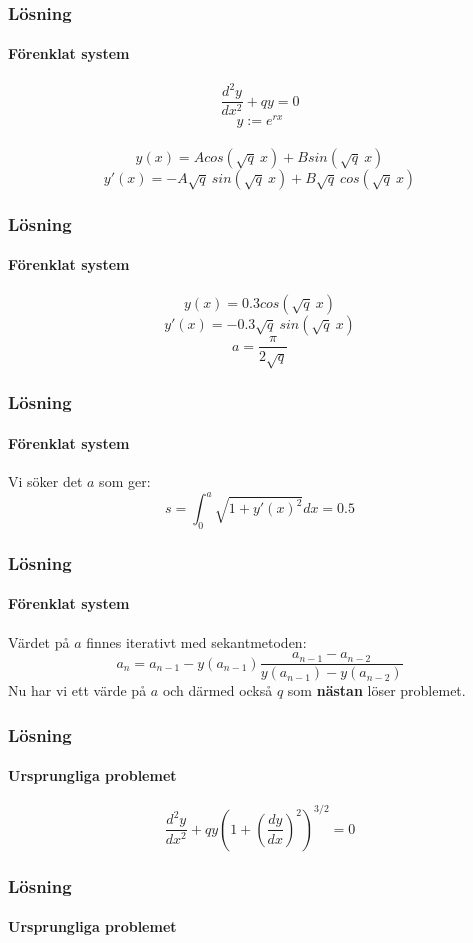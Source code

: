 \documentclass[xcolor=dvipsnames]{beamer}
\begin{document}
\begin{frame}
\frametitle{Lösning}
\framesubtitle{Förenklat system}
\begin{equation} \label{eq:simplified}
	\dfrac{d^2y}{dx^2} + qy = 0 \nonumber
\end{equation}
\begin{equation}
	y:=e^{rx} \nonumber
\end{equation}
\\
\begin{equation}
 y(x) = A cos(\sqrt{q}\:x)+B sin(\sqrt{q}\:x) \nonumber
\end{equation}
\begin{equation}
 y'(x) = -A\sqrt{q}\: sin(\sqrt{q}\:x) + B\sqrt{q}\:cos(\sqrt{q}\:x) \nonumber
\end{equation}
\end{frame}

\begin{frame}
\frametitle{Lösning}
\framesubtitle{Förenklat system}
\begin{equation} \label{eq:y}
 y(x) = 0.3 cos(\sqrt{q}\:x) \nonumber
\end{equation}
\begin{equation} \label{eq:yprime}
 y'(x) = -0.3\sqrt{q}\: sin(\sqrt{q}\:x) \nonumber
\end{equation}
\begin{equation}
 a = \dfrac{\pi}{2\sqrt{q}} \nonumber
\end{equation}
\end{frame}

\begin{frame}
\frametitle{Lösning}
\framesubtitle{Förenklat system}
Vi söker det $a$ som ger:
\begin{equation}
s = \int_0^a{\sqrt{1+y'(x)^2}}{dx}=0.5 \nonumber
\end{equation}
\usebox{\firstexample}
\end{frame}

\begin{frame}
\frametitle{Lösning}
\framesubtitle{Förenklat system}
Värdet på $a$ finnes iterativt med sekantmetoden:
\begin{equation}
a_n =a_{n-1}-y(a_{n-1})\frac{a_{n-1}-a_{n-2}}{y(a_{n-1})-y(a_{n-2})} \nonumber
\end{equation}
Nu har vi ett värde på $a$ och därmed också $q$ som \textbf{nästan} löser problemet.
\end{frame}

\begin{frame}
\frametitle{Lösning}
\framesubtitle{Ursprungliga problemet}
\begin{equation} \label{eq:original}
	\dfrac{d^2y}{dx^2} + qy \left(1+\left(\dfrac{dy}{dx}\right)^2\right)^{3/2} = 0 \nonumber
\end{equation}
\end{frame}
\begin{frame}
\frametitle{Lösning}
\framesubtitle{Ursprungliga problemet}
\usebox{\findroot}
\usebox{\original}
\end{frame}
\end{document}
